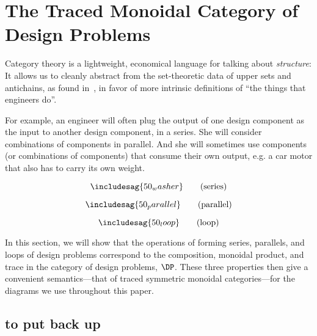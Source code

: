 \section{The Traced Monoidal Category of Design Problems}

Category theory is a lightweight, economical language for talking about \emph{structure}: It allows us to cleanly abstract from the set-theoretic data of upper sets and antichains, as found in~\cite{censi16}, in favor of more intrinsic definitions of ``the things that engineers do''.

For example, an engineer will often plug the output of one design component as the input to another design component, in a series. She will consider combinations of components in parallel. And she will sometimes use components (or combinations of components) that consume their own output, e.g. a car motor that also has to carry its own weight.

\begin{equation*}
\includesag{50_washer}
\tag{series}
\end{equation*}


\begin{equation*}
\includesag{50_parallel}
\tag{parallel}
\end{equation*}

\begin{equation*}
\includesag{50_loop}
\tag{loop}
\end{equation*}

In this section, we will show that the operations of forming series, parallels, and loops of design problems correspond to the composition, monoidal product, and trace in the category of design problems, $\DP$. These three properties then give a convenient semantics---that of traced symmetric monoidal categories---for the diagrams we use throughout this paper.




\subsection{to put back up}


